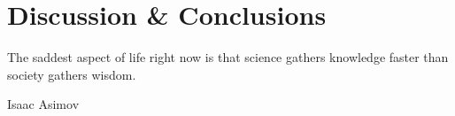 \chapter{Discussion \& Conclusions}\label{discussion}

\epigraph{The saddest aspect of life right now is that science gathers knowledge faster than society gathers wisdom.}{Isaac Asimov}








\begin{comment}
    


In this case, the angular momentum vectors of the inner binary and the inflowing gas are (almost) aligned, hence less angular momentum is required to accelerate the gas to the escape velocity. Furthermore, on the current resolution the gas drag is considerably underestimated.

Indeed, when the angular momentum vectors of the inner binary and the inflowing gas are (almost) aligned, less angular momentum needs to be transferred to speed up the gas to the escape velocity.


s.

The work is partially exploratory, as I try to test the efficiency of the method considering different internal structure for the donor star.


I use AMUSE \citep{pelupessy2013astrophysical,portegies2018astrophysical} in order to handle stellar evolution, hydrodynamics and gravity in a self-consistent way.




\section{Discussion}

In this section, I describe some crucial features of the modeling method that will assist the reader in interpreting the graphs, presented in the next sections. 
\end{comment}
